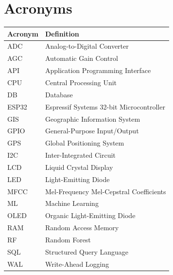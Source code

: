 \documentclass[11pt,a4paper,oneside]{report}
\begin{document}
\section*{Acronyms}
\begin{table}[H]
\centering
\begin{tabular}{ll}
\toprule
\textbf{Acronym} & \textbf{Definition} \\
\midrule
ADC & Analog-to-Digital Converter \\
AGC & Automatic Gain Control \\
API & Application Programming Interface \\
CPU & Central Processing Unit \\
DB & Database \\
ESP32 & Espressif Systems 32-bit Microcontroller \\
GIS & Geographic Information System \\
GPIO & General-Purpose Input/Output \\
GPS & Global Positioning System \\
I2C & Inter-Integrated Circuit \\
LCD & Liquid Crystal Display \\
LED & Light-Emitting Diode \\
MFCC & Mel-Frequency Mel-Cepstral Coefficients \\
ML & Machine Learning \\
OLED & Organic Light-Emitting Diode \\
RAM & Random Access Memory \\
RF & Random Forest \\
SQL & Structured Query Language \\
WAL & Write-Ahead Logging \\
\bottomrule
\end{tabular}
\end{table}
\end{document}

